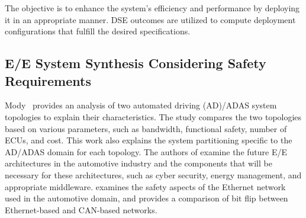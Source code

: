 The objective is to enhance the system's efficiency and performance by deploying it in an appropriate manner. DSE outcomes are utilized to compute deployment configurations that fulfill the desired specifications.


 


\subsection{E/E System Synthesis Considering Safety Requirements}

Mody~\cite{mody2018understanding} provides an analysis of two automated driving (AD)/ADAS system topologies to explain their characteristics. The study compares the two topologies based on various parameters, such as bandwidth, functional safety, number of ECUs, and cost.
This work also explains the system partitioning specific to the AD/ADAS domain for each topology.
The authors of \cite{zerfowski2019functional} examine the future E/E architectures in the automotive industry and the components that will be necessary for these architectures, such as cyber security, energy management, and appropriate middleware.
\cite{van2018functional} examines the safety aspects of the Ethernet network used in the automotive domain, and provides a comparison of bit flip between Ethernet-based and CAN-based networks.
